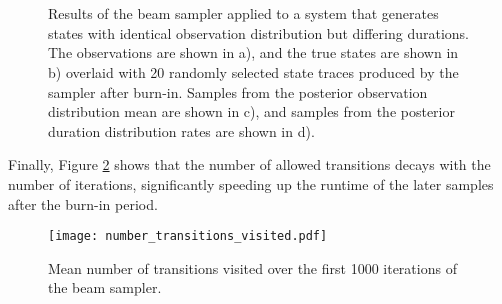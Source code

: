 \begin{figure}
     \\
     \\
    \caption{Results of the beam sampler applied to a system that generates states with identical observation distribution but differing durations. The observations are shown in a), and the true states are shown in b) overlaid with 20 randomly selected state traces produced by the sampler after burn-in. Samples from the posterior observation distribution mean are shown in c), and samples from the posterior duration distribution rates are shown in d).}
    \label{fig:experiment2_results}
\end{figure}



Finally, Figure \ref{fig:allowed} shows that the number of allowed transitions decays with the number of iterations, significantly speeding up the runtime of the later samples after the burn-in period. 


\begin{figure}
    \texttt{[image: number\_transitions\_visited.pdf]}

\caption{Mean number of transitions visited over the first 1000 iterations of the beam sampler.}
\label{fig:allowed}
\end{figure}
